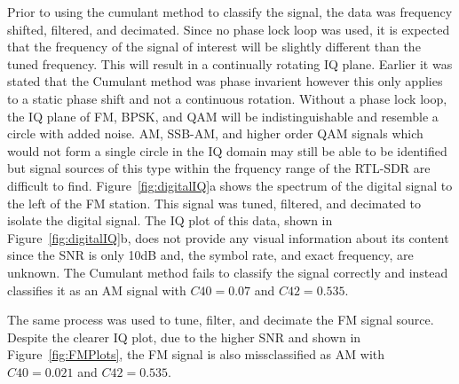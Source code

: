 Prior to using the cumulant method to classify the signal, the data was
frequency shifted, filtered, and decimated.  Since no phase lock loop was used,
it is expected that the frequency of the signal of interest will be slightly
different than the tuned frequency.  This will result in a continually rotating
IQ plane.
Earlier it was stated that the Cumulant method was phase invarient however this
only applies to a static phase shift and not a continuous rotation.  Without a phase
lock loop, the IQ plane of FM, BPSK, and QAM will be indistinguishable and
resemble a circle with added noise.
AM, SSB-AM, and higher order QAM signals which would not form a single circle in
the IQ domain may still be able to be identified but signal sources of this type
within the frquency range of the RTL-SDR are difficult to find.
Figure~\ref{fig:digitalIQ}a shows the spectrum of the digital signal to the
left of the FM station.  This signal was tuned, filtered, and decimated to
isolate the digital signal.  The IQ plot of this data, shown in
Figure~\ref{fig:digitalIQ}b, does not provide any visual information about its
content since the SNR is only 10dB and, the symbol rate, and exact
frequency, are unknown.  The Cumulant method fails to classify the signal
correctly and instead classifies it as an AM signal with $C40 = 0.07$ and $C42 = 0.535$.

The same process was used to tune, filter, and decimate the FM signal source. 
Despite the clearer IQ plot, due to the higher SNR and shown in
Figure~\ref{fig:FMPlots}, the FM signal is also missclassified as AM with $C40 = 0.021$ and $C42 =  0.535$.

